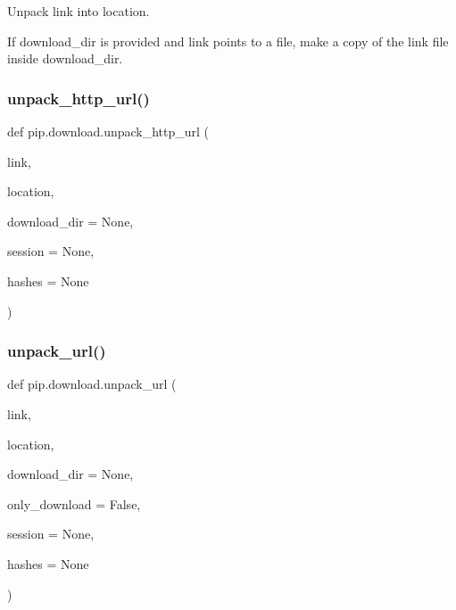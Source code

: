 \begin{DoxyVerb}Unpack link into location.

If download_dir is provided and link points to a file, make a copy
of the link file inside download_dir.
\end{DoxyVerb}
 \mbox{\label{namespacepip_1_1download_ad5084221b7a7bd5dd25924defc00e79d}} 
\subsubsection{\texorpdfstring{unpack\+\_\+http\+\_\+url()}{unpack\_http\_url()}}
{\footnotesize\ttfamily def pip.\+download.\+unpack\+\_\+http\+\_\+url (\begin{DoxyParamCaption}\item[{}]{link,  }\item[{}]{location,  }\item[{}]{download\+\_\+dir = {\ttfamily None},  }\item[{}]{session = {\ttfamily None},  }\item[{}]{hashes = {\ttfamily None} }\end{DoxyParamCaption})}

\mbox{\label{namespacepip_1_1download_a89f50969cc2d8f8ecf384c7b4f1a4031}} 
\subsubsection{\texorpdfstring{unpack\+\_\+url()}{unpack\_url()}}
{\footnotesize\ttfamily def pip.\+download.\+unpack\+\_\+url (\begin{DoxyParamCaption}\item[{}]{link,  }\item[{}]{location,  }\item[{}]{download\+\_\+dir = {\ttfamily None},  }\item[{}]{only\+\_\+download = {\ttfamily False},  }\item[{}]{session = {\ttfamily None},  }\item[{}]{hashes = {\ttfamily None} }\end{DoxyParamCaption})}

